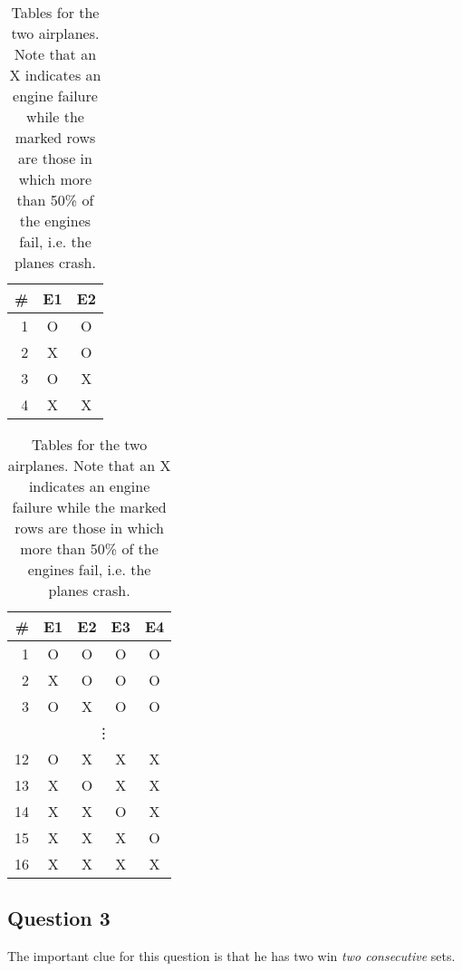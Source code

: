 \documentclass[../main/Notes.tex]{subfiles}
\begin{document}
\begin{table}[h]
  \centering
  \begin{subtable}[t]{.45\linewidth}
  \centering
    \begin{tabular}{r|cc}
    \# & E1 & E2 \\
    \hline
    1 & O & O \\
    2 & X & O \\
    3 & O & X \\
    \rowcolor{red!10}{}4 & X & X \\
    \end{tabular}
  \caption{two engine plane}
  \end{subtable}
  \hfill
  \begin{subtable}[t]{.45\linewidth}
  \centering
    \begin{tabular}{r|cccc}
    \# & E1 & E2 & E3 & E4 \\
    \hline
    1 & O & O & O & O \\
    2 & X & O & O & O \\
    3 & O & X & O & O \\
      & \multicolumn{4}{c}{\vdots} \\
    \rowcolor{red!10}{}12 & O & X & X & X \\
    \rowcolor{red!10}{}13 & X & O & X & X \\
    \rowcolor{red!10}{}14 & X & X & O & X \\
    \rowcolor{red!10}{}15 & X & X & X & O \\
    \rowcolor{red!10}{}16 & X & X & X & X 
    \end{tabular}
  \caption{four engine plane}
  \end{subtable}
  
\caption{Tables for the two airplanes. Note that an X indicates an engine failure while the marked rows are those in which more than 50\% of the engines fail, i.e. the planes crash.}
\label{tab:2014-06-06_planes}
\end{table}



\subsection*{Question 3}
The important clue for this question is that he has two win \textit{two consecutive} sets.
\end{document}

